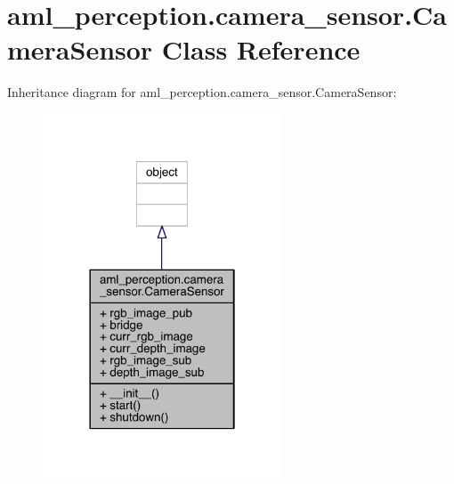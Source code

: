 \hypertarget{classaml__perception_1_1camera__sensor_1_1_camera_sensor}{}\section{aml\+\_\+perception.\+camera\+\_\+sensor.\+Camera\+Sensor Class Reference}
\label{classaml__perception_1_1camera__sensor_1_1_camera_sensor}


Inheritance diagram for aml\+\_\+perception.\+camera\+\_\+sensor.\+Camera\+Sensor\+:\nopagebreak
\begin{figure}[H]
\begin{center}
\leavevmode
\includegraphics[width=201pt]{classaml__perception_1_1camera__sensor_1_1_camera_sensor__inherit__graph}
\end{center}
\end{figure}


